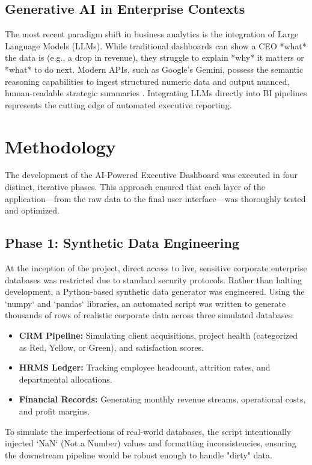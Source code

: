 \documentclass{book}
\begin{document}
\section{Generative AI in Enterprise Contexts}
The most recent paradigm shift in business analytics is the integration of Large Language Models (LLMs). While traditional dashboards can show a CEO *what* the data is (e.g., a drop in revenue), they struggle to explain *why* it matters or *what* to do next. Modern APIs, such as Google's Gemini, possess the semantic reasoning capabilities to ingest structured numeric data and output nuanced, human-readable strategic summaries \cite{gemini_api}. Integrating LLMs directly into BI pipelines represents the cutting edge of automated executive reporting.


\chapter{Methodology}

The development of the AI-Powered Executive Dashboard was executed in four distinct, iterative phases. This approach ensured that each layer of the application—from the raw data to the final user interface—was thoroughly tested and optimized.

\section{Phase 1: Synthetic Data Engineering}
At the inception of the project, direct access to live, sensitive corporate enterprise databases was restricted due to standard security protocols. Rather than halting development, a Python-based synthetic data generator was engineered. 
Using the `numpy` and `pandas` libraries, an automated script was written to generate thousands of rows of realistic corporate data across three simulated databases:
\begin{itemize}
    \item \textbf{CRM Pipeline:} Simulating client acquisitions, project health (categorized as Red, Yellow, or Green), and satisfaction scores.
    \item \textbf{HRMS Ledger:} Tracking employee headcount, attrition rates, and departmental allocations.
    \item \textbf{Financial Records:} Generating monthly revenue streams, operational costs, and profit margins.
\end{itemize}
To simulate the imperfections of real-world databases, the script intentionally injected `NaN` (Not a Number) values and formatting inconsistencies, ensuring the downstream pipeline would be robust enough to handle "dirty" data.
\end{document}
